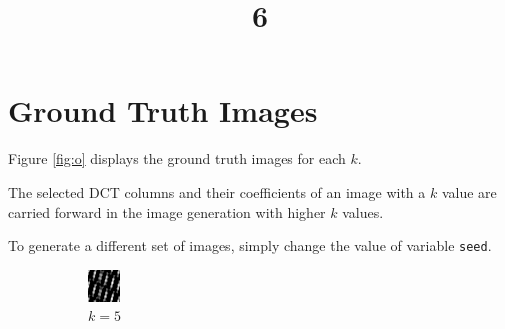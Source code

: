 \documentclass[a4paper, landscape]{article}
\title{6}
\date{}
\begin{document}
\maketitle
\section{Ground Truth Images}
Figure \ref{fig:o} displays the ground truth images for each $k$.

The selected DCT columns and their coefficients of an image with a $k$ value are carried forward in the image generation with higher $k$ values.

To generate a different set of images, simply change the value of variable \verb!seed!.
\begin{figure}[H]
    \centering
    \begin{subfigure}{0.09\linewidth}
        \centering
        \includegraphics[width=\linewidth]{k = 5.png}
        \caption{$k = 5$}
    \end{subfigure}
    \begin{subfigure}{0.09\linewidth}
        \centering

\end{subfigure}
\end{figure}
\end{document}
